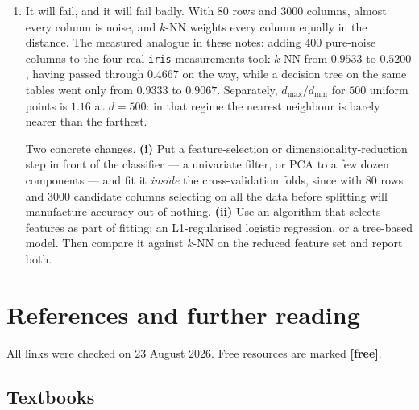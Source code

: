 \documentclass[11pt]{article}
\begin{document}
\begin{enumerate}[leftmargin=*, itemsep=0.7em]
  Note that the split now happens \emph{first}, the scaler is refitted inside
  every fold, $k$ is chosen on the training data only, and the reported number
  comes from rows the whole procedure has never seen.

\item It will fail, and it will fail badly. With $80$ rows and $3000$ columns,
  almost every column is noise, and $k$-NN weights every column equally in the
  distance. The measured analogue in these notes: adding $400$ pure-noise
  columns to the four real \texttt{iris} measurements took $k$-NN from
  $0.9533$ to $\mathbf{0.5200}$, having passed through $0.4667$ on the way,
  while a decision tree on the same tables went only from $0.9333$ to
  $0.9067$. Separately, $d_{\max}/d_{\min}$ for $500$ uniform points is
  $1.16$ at $d = 500$: in that regime the nearest neighbour is barely nearer
  than the farthest.

  Two concrete changes. \textbf{(i)} Put a feature-selection or
  dimensionality-reduction step in front of the classifier --- a univariate
  filter, or PCA to a few dozen components --- and fit it \emph{inside} the
  cross-validation folds, since with $80$ rows and $3000$ candidate columns
  selecting on all the data before splitting will manufacture accuracy out of
  nothing. \textbf{(ii)} Use an algorithm that selects features as part of
  fitting: an L1-regularised logistic regression, or a tree-based model. Then
  compare it against $k$-NN on the reduced feature set and report both.

\end{enumerate}

\section{References and further reading}
\label{sec:refs}

All links were checked on 23 August 2026. Free resources are marked
\textbf{[free]}.

\subsection*{Textbooks}
\end{document}

